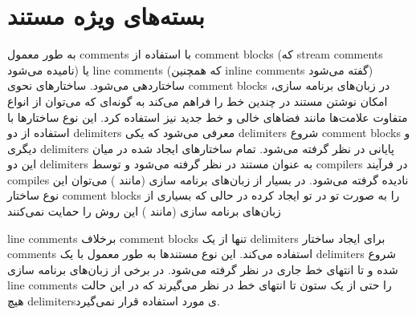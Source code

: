 %
% 
% 
% 
%
\section{بسته‌های ویژه مستند}

به طور معمول \glspl{comment} با استفاده از \glspl{comment block} (که
\glspl{stream comment} نامیده می‌شود) یا \glspl{line comment} (که همچنین
\glspl{inline comment} گفته می‌شود) ساختاردهی می‌شود\cite{wiki6}. ساختارهای نحوی
\glspl{comment block} در زبان‌های برنامه سازی، امکان نوشتن
مستند در چندین خط را فراهم می‌کند به گونه‌ای که می‌توان از انواع متفاوت علامت‌ها
مانند فضاهای خالی و خط جدید نیز استفاده کرد. این نوع ساختارها با استفاده از دو
\glspl{delimiter} معرفی می‌شود که یکی \glspl{delimiter} شروع \glspl{comment
block} و دیگری \glspl{delimiter} پایانی در نظر گرفته می‌شود. تمام ساختارهای
ایجاد شده در میان این دو \glspl{delimiter} به عنوان مستند در نظر گرفته می‌شود و
توسط \glspl{compiler} در فرآیند \glspl{compile} نادیده گرفته می‌شود. در بسیار از
زبان‌های برنامه سازی (مانند ) می‌توان این نوع ساختار \glspl{comment
block} را به صورت تو در تو ایجاد کرده در حالی که بسیاری از زبان‌های برنامه سازی
(مانند ) این روش را حمایت نمی‌کنند\cite{wiki[7][8][9]}

\glspl{line comment} برخلاف \glspl{comment block} تنها از یک \glspl{delimiter}
برای ایجاد ساختار \glspl{comment} استفاده می‌کند. این نوع مستندها به طور معمول
با یک \glspl{delimiter} شروع شده و تا انتهای خط جاری در نظر گرفته می‌شود. در
برخی از زبان‌های برنامه سازی \glspl{line comment} را حتی از یک ستون تا انتهای خط
در نظر می‌گیرند که در این حالت هیچ \glspl{delimiter}ی مورد استفاده قرار
نمی‌گیرد\cite{wiki9}.


